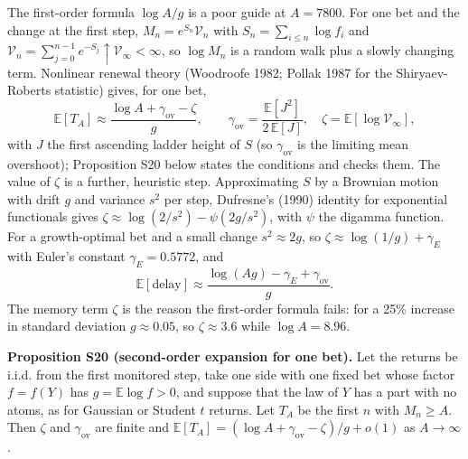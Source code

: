 \documentclass[
]{article}
\begin{document}
The first-order formula \(\log A / g\) is a poor guide at \(A = 7800\).
For one bet and the change at the first step,
\(M_n = e^{S_n} \mathcal{V}_n\) with \(S_n = \sum_{i \le n} \log f_i\)
and
\(\mathcal{V}_n = \sum_{j=0}^{n-1} e^{-S_j} \uparrow \mathcal{V}_\infty < \infty\),
so \(\log M_n\) is a random walk plus a slowly changing term. Nonlinear
renewal theory (Woodroofe 1982; Pollak 1987 for the Shiryaev-Roberts
statistic) gives, for one bet, \[
\mathbb{E}[T_A] \approx \frac{\log A + \gamma_{\mathrm{ov}} - \zeta}{g}, \qquad \gamma_{\mathrm{ov}} = \frac{\mathbb{E}[J^2]}{2\,\mathbb{E}[J]}, \quad \zeta = \mathbb{E}[\log \mathcal{V}_\infty],
\] with \(J\) the first ascending ladder height of \(S\) (so
\(\gamma_{\mathrm{ov}}\) is the limiting mean overshoot); Proposition
S20 below states the conditions and checks them. The value of \(\zeta\)
is a further, heuristic step. Approximating \(S\) by a Brownian motion
with drift \(g\) and variance \(s^2\) per step, Dufresne's (1990)
identity for exponential functionals gives
\(\zeta \approx \log(2/s^2) - \psi(2g/s^2)\), with \(\psi\) the digamma
function. For a growth-optimal bet and a small change
\(s^2 \approx 2g\), so \(\zeta \approx \log(1/g) + \gamma_E\) with
Euler's constant \(\gamma_E = 0.5772\), and \[
\mathbb{E}[\text{delay}] \approx \frac{\log(A g) - \gamma_E + \gamma_{\mathrm{ov}}}{g}.
\] The memory term \(\zeta\) is the reason the first-order formula
fails: for a 25\% increase in standard deviation \(g \approx 0.05\), so
\(\zeta \approx 3.6\) while \(\log A = 8.96\).

\textbf{Proposition S20 (second-order expansion for one bet).} Let the
returns be i.i.d. from the first monitored step, take one side with one
fixed bet whose factor \(f = f(Y)\) has \(g = \mathbb{E}\log f > 0\),
and suppose that the law of \(Y\) has a part with no atoms, as for
Gaussian or Student \(t\) returns. Let \(T_A\) be the first \(n\) with
\(M_n \ge A\). Then \(\zeta\) and \(\gamma_{\mathrm{ov}}\) are finite
and
\(\mathbb{E}[T_A] = (\log A + \gamma_{\mathrm{ov}} - \zeta)/g + o(1)\)
as \(A \to \infty\).
\end{document}
